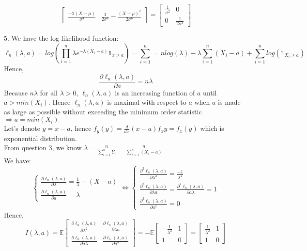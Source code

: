 \documentclass[10pt]{article}
\newenvironment{problem}[2][Problem]{\begin{trivlist}
\item[\hskip \labelsep {\bfseries #1}\hskip \labelsep {\bfseries #2.}]}{\end{trivlist}}
\begin{document}
\begin{problem}{1}
\[\begin{bmatrix}
    \frac{-2(X-\mu)}{\sigma^3} & \frac{1}{2\sigma^4} - \frac{(X-\mu)^2}{2\sigma^6}
\end{bmatrix}= \begin{bmatrix}
\frac{1}{\sigma^2} & 0 \\
0 & \frac{1}{2\sigma^4}
\end{bmatrix} \]
\item 5.
We have the log-likelihood function:  
\[\ell_n(\lambda, a) = log(\prod_{i=1}^{n}\lambda e^{-\lambda(X_i-a)} \mathbb{1}_{x \geq a}) = \sum_{i=1}^{n}= nlog(\lambda) - \lambda \sum_{i=1}^{n}(X_i-a) +\sum_{i=1}^{n}log(\mathbb{1}_{X_i \geq a}) \]
Hence,
\[\frac{\partial\ell_n(\lambda, a)}{\partial a}=  n\lambda   \]
Because $n\lambda $ for all $\lambda > 0$, $\ell_n(\lambda, a)$ is an increasing function of $a$ until $a > min(X_i)$. Hence $\ell_n(\lambda, a)$ is maximal with respect to $a$ when $a$ is made as large as possible without exceeding the minimum order statistic $\Longrightarrow a=min(X_i)$\\
Let's denote $y=x-a$, hence $f_{y}(y)=\frac{d}{dx}(x-a)f_{x}{y}=f_{x}(y)$ which is exponential distribution.\\ 
From question 3, we know $\lambda=\frac{n}{\sum_{i=1}^{n}Y_i}=\frac{n}{\sum_{i=1}^{n}(X_i-a)}$\\
We have: 
\[ \begin{cases} \frac{\partial\ell_n(\lambda, a)}{\partial \lambda} =   \frac{1}{\lambda} - (X -a) \\ \frac{\partial\ell_n(\lambda, a)}{\partial a} = \lambda   \end{cases} \Leftrightarrow \begin{cases}  \frac{\partial^2\ell_n(\lambda, a)}{\partial \lambda^2} = \frac{-1}{\lambda^2} \\ \frac{\partial^2\ell_n(\lambda, a)}{\partial \lambda a} = \frac{\partial^2\ell_n(\lambda, a)}{\partial a\lambda}= 1 \\ \frac{\partial^2\ell_n(\lambda, a)}{\partial a^2} = 0 \end{cases}\]
Hence,
\[ I(\lambda , a)=\mathbb{E} \begin{bmatrix}
    \frac{\partial \ell_n(\lambda, a)}{\partial \lambda^2} & \frac{\partial \ell_n(\lambda, a)}{\partial \lambda a}\\
    \frac{\partial \ell_n(\lambda, a)}{\partial a \lambda} & \frac{\partial \ell_n(\lambda, a)}{\partial a^2}
\end{bmatrix} = -\mathbb{E} \begin{bmatrix}
    -\frac{1}{\lambda^2} & 1 \\
    1 & 0
\end{bmatrix}= \begin{bmatrix}
\frac{1}{\lambda^2} & 1 \\
1 & 0
\end{bmatrix} \]



\end{problem}
\end{document}
